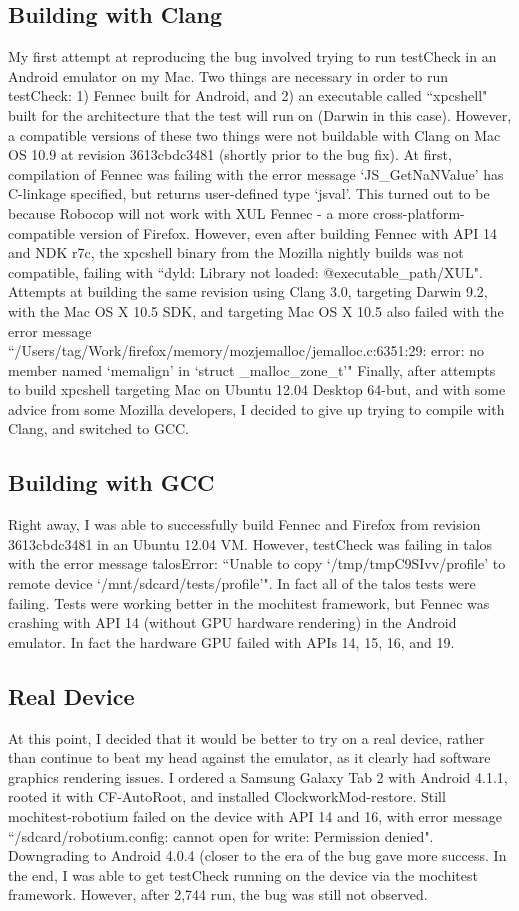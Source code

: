 \documentclass[12pt,conference]{IEEEtran}
\begin{document}
\subsection{Building with Clang}
My first attempt at reproducing the bug involved trying to run testCheck in an Android emulator on my Mac.  Two things are necessary in order to run testCheck: 1) Fennec built for Android, and 2) an executable called ``xpcshell" built for the architecture that the test will run on (Darwin in this case).  However, a compatible versions of these two things were not buildable with Clang on Mac OS 10.9 at revision 3613cbdc3481 (shortly prior to the bug fix).  At first, compilation of Fennec was failing with the error message `JS\_GetNaNValue' has C-linkage specified, but returns user-defined type `jsval'.  This turned out to be because Robocop will not work with XUL Fennec - a more cross-platform-compatible version of Firefox.  However, even after building Fennec with API 14 and NDK r7c, the xpcshell binary from the Mozilla nightly builds was not compatible, failing with ``dyld: Library not loaded: @executable\_path/XUL".
Attempts at building the same revision using Clang 3.0, targeting Darwin 9.2, with the Mac OS X 10.5 SDK, and targeting Mac OS X 10.5 also failed with the error message ``/Users/tag/Work/firefox/memory/mozjemalloc/jemalloc.c:6351:29: error: no member named `memalign' in `struct \_malloc\_zone\_t'"  Finally, after attempts to build xpcshell targeting Mac on Ubuntu 12.04 Desktop 64-but, and with some advice from some Mozilla developers, I decided to give up trying to compile with Clang, and switched to GCC.
\subsection{Building with GCC}
Right away, I was able to successfully build Fennec and Firefox from revision 3613cbdc3481 in an Ubuntu 12.04 VM.  However, testCheck was failing in talos with the error message talosError: ``Unable to copy `/tmp/tmpC9SIvv/profile' to remote device `/mnt/sdcard/tests/profile'".  In fact all of the talos tests were failing.  Tests were working better in the mochitest framework, but Fennec was crashing with API 14 (without GPU hardware rendering) in the Android emulator.  In fact the hardware GPU failed with APIs 14, 15, 16, and 19.
\subsection{Real Device}
At this point, I decided that it would be better to try on a real device, rather than continue to beat my head against the emulator, as it clearly had software graphics rendering issues.  I ordered a Samsung Galaxy Tab 2 with Android 4.1.1, rooted it with CF-AutoRoot, and installed ClockworkMod-restore.  Still mochitest-robotium failed on the device with API 14 and 16, with error message ``/sdcard/robotium.config: cannot open for write: Permission denied".  Downgrading to Android 4.0.4 (closer to the era of the bug gave more success.  In the end, I was able to get testCheck running on the device via the mochitest framework.  However, after 2,744 run, the bug was still not observed.
\end{document}
